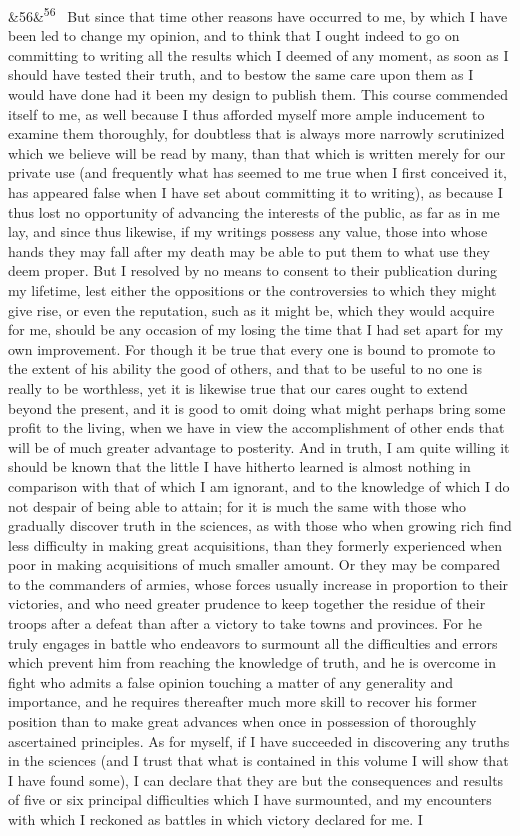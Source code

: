 \documentclass[12pt]{article}
\newcommand{\para}[1][]{\par\noindent\ifx&#1&\else\textsuperscript{\footnotesize #1}~\fi}
\begin{document}
\para[56] But since that time other reasons have occurred to me, by which I have been led to change my opinion, and to think that I ought indeed to go on committing to writing all the results which I deemed of any moment, as soon as I should have tested their truth, and to bestow the same care upon them as I would have done had it been my design to publish them. This course commended itself to me, as well because I thus afforded myself more ample inducement to examine them thoroughly, for doubtless that is always more narrowly scrutinized which we believe will be read by many, than that which is written merely for our private use (and frequently what has seemed to me true when I first conceived it, has appeared false when I have set about committing it to writing), as because I thus lost no opportunity of advancing the interests of the public, as far as in me lay, and since thus likewise, if my writings possess any value, those into whose hands they may fall after my death may be able to put them to what use they deem proper. But I resolved by no means to consent to their publication during my lifetime, lest either the oppositions or the controversies to which they might give rise, or even the reputation, such as it might be, which they would acquire for me, should be any occasion of my losing the time that I had set apart for my own improvement. For though it be true that every one is bound to promote to the extent of his ability the good of others, and that to be useful to no one is really to be worthless, yet it is likewise true that our cares ought to extend beyond the present, and it is good to omit doing what might perhaps bring some profit to the living, when we have in view the accomplishment of other ends that will be of much greater advantage to posterity. And in truth, I am quite willing it should be known that the little I have hitherto learned is almost nothing in comparison with that of which I am ignorant, and to the knowledge of which I do not despair of being able to attain; for it is much the same with those who gradually discover truth in the sciences, as with those who when growing rich find less difficulty in making great acquisitions, than they formerly experienced when poor in making acquisitions of much smaller amount. Or they may be compared to the commanders of armies, whose forces usually increase in proportion to their victories, and who need greater prudence to keep together the residue of their troops after a defeat than after a victory to take towns and provinces. For he truly engages in battle who endeavors to surmount all the difficulties and errors which prevent him from reaching the knowledge of truth, and he is overcome in fight who admits a false opinion touching a matter of any generality and importance, and he requires thereafter much more skill to recover his former position than to make great advances when once in possession of thoroughly ascertained principles. As for myself, if I have succeeded in discovering any truths in the sciences (and I trust that what is contained in this volume I will show that I have found some), I can declare that they are but the consequences and results of five or six principal difficulties which I have surmounted, and my encounters with which I reckoned as battles in which victory declared for me. I 
\end{document}
